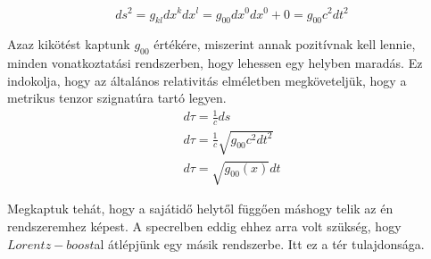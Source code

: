 \documentclass[a4paper, 12pt]{article}
\begin{document}
\begin{equation*}
    ds^{2} = g_{kl}dx^{k}dx^{l} = g_{00}dx^{0}dx^{0} + 0 = g_{00}c^{2}dt^{2}
\end{equation*}
\par Azaz kikötést kaptunk $g_{00}$ értékére, miszerint annak pozitívnak kell lennie, minden vonatkoztatási rendszerben, hogy lehessen egy helyben maradás. Ez indokolja, hogy az általános relativitás elméletben megköveteljük, hogy a metrikus tenzor szignatúra tartó legyen.
\begin{gather*}
    d\tau = \frac{1}{c}ds \\
    d\tau = \frac{1}{c}\sqrt{g_{00}c^{2}dt^{2}} \\
    d\tau = \sqrt{g_{00}(x)}dt
\end{gather*}
\par Megkaptuk tehát, hogy a sajátidő helytől függően máshogy telik az én rendszeremhez képest. A specrelben eddig ehhez arra volt szükség, hogy $Lorentz-boost$al átlépjünk egy másik rendszerbe. Itt ez a tér tulajdonsága.
\end{document}
